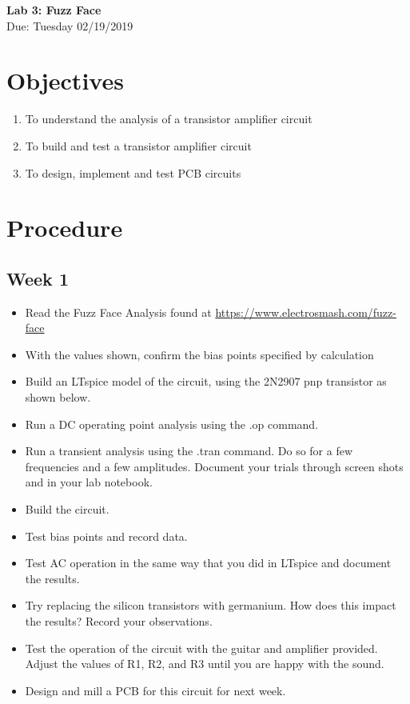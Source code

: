\documentclass[12pt,letterpaper,onecolumn]{report}
\begin{document}
\begin{center}
\LARGE{\textbf{Lab 3: Fuzz Face}}\\
\Large{Due: Tuesday 02/19/2019}
\\

\end{center}

\section*{Objectives}
\begin{enumerate}
\item To understand the analysis of a transistor amplifier circuit
\item To build and test a transistor amplifier circuit
\item To design, implement and test PCB circuits
\end{enumerate}

\section*{Procedure}
\subsection*{Week 1}
\begin{itemize}
\item Read the Fuzz Face Analysis found at \url{https://www.electrosmash.com/fuzz-face}
\item With the values shown, confirm the bias points specified by calculation
\item Build an LTspice model of the circuit, using the 2N2907 pnp transistor as shown below.
\item Run a DC operating point analysis using the .op command.
\item Run a transient analysis using the .tran command.  Do so for a few frequencies and a few amplitudes.  Document your trials through screen shots and in your lab notebook.
\item Build the circuit.
\item Test bias points and record data.
\item Test AC operation in the same way that you did in LTspice and document the results.
\item Try replacing the silicon transistors with germanium.  How does this impact the results?  Record your observations.
\item Test the operation of the circuit with the guitar and amplifier provided.  Adjust the values of R1, R2, and R3 until you are happy with the sound.
\item Design and mill a PCB for this circuit for next week.
\end{itemize}
\end{document}
